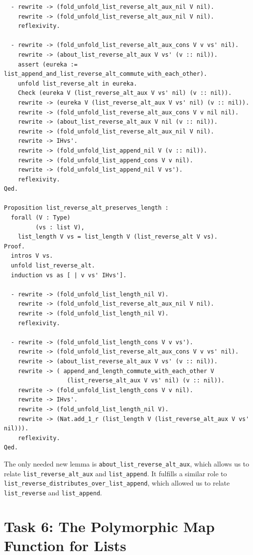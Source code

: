 \documentclass{article}
\begin{document}
\begin{lstlisting}
  - rewrite -> (fold_unfold_list_reverse_alt_aux_nil V nil).
    rewrite -> (fold_unfold_list_reverse_alt_aux_nil V nil).
    reflexivity.

  - rewrite -> (fold_unfold_list_reverse_alt_aux_cons V v vs' nil).
    rewrite -> (about_list_reverse_alt_aux V vs' (v :: nil)).
    assert (eureka := list_append_and_list_reverse_alt_commute_with_each_other).
    unfold list_reverse_alt in eureka.
    Check (eureka V (list_reverse_alt_aux V vs' nil) (v :: nil)).
    rewrite -> (eureka V (list_reverse_alt_aux V vs' nil) (v :: nil)).
    rewrite -> (fold_unfold_list_reverse_alt_aux_cons V v nil nil).
    rewrite -> (about_list_reverse_alt_aux V nil (v :: nil)).
    rewrite -> (fold_unfold_list_reverse_alt_aux_nil V nil).
    rewrite -> IHvs'.
    rewrite -> (fold_unfold_list_append_nil V (v :: nil)).
    rewrite -> (fold_unfold_list_append_cons V v nil).
    rewrite -> (fold_unfold_list_append_nil V vs').
    reflexivity.
Qed.

Proposition list_reverse_alt_preserves_length :
  forall (V : Type)
         (vs : list V),
    list_length V vs = list_length V (list_reverse_alt V vs).
Proof.
  intros V vs.
  unfold list_reverse_alt.
  induction vs as [ | v vs' IHvs'].

  - rewrite -> (fold_unfold_list_length_nil V).
    rewrite -> (fold_unfold_list_reverse_alt_aux_nil V nil).
    rewrite -> (fold_unfold_list_length_nil V).
    reflexivity.

  - rewrite -> (fold_unfold_list_length_cons V v vs').
    rewrite -> (fold_unfold_list_reverse_alt_aux_cons V v vs' nil).
    rewrite -> (about_list_reverse_alt_aux V vs' (v :: nil)).
    rewrite -> ( append_and_length_commute_with_each_other V
                  (list_reverse_alt_aux V vs' nil) (v :: nil)).
    rewrite -> (fold_unfold_list_length_cons V v nil).
    rewrite -> IHvs'.
    rewrite -> (fold_unfold_list_length_nil V).
    rewrite -> (Nat.add_1_r (list_length V (list_reverse_alt_aux V vs' nil))).
    reflexivity.
Qed.
\end{lstlisting}

The only needed new lemma is \texttt{about\_list\_reverse\_alt\_aux}, which allows us to relate \texttt{list\_reverse\_alt\_aux} and \texttt{list\_append}. It fulfills a similar role to \texttt{list\_reverse\_distributes\_over\_list\_append}, which allowed us to relate \texttt{list\_reverse} and \texttt{list\_append}.

\newpage

\section{Task 6: The Polymorphic Map Function for Lists}
\end{document}

